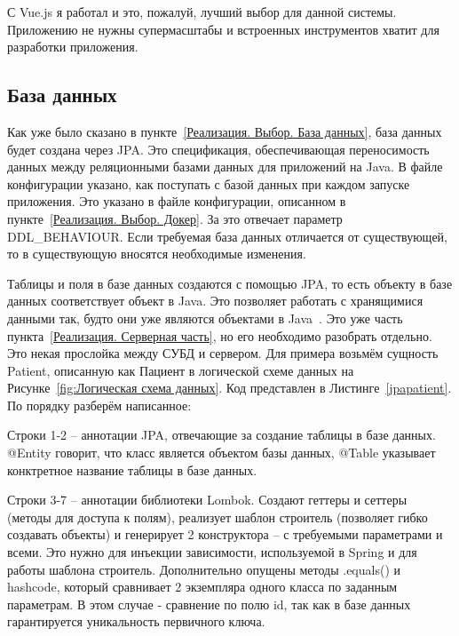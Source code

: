 \documentclass[a4paper,article]{article}
\begin{document}
    С Vue.js я работал и это, пожалуй, лучший выбор для данной системы. Приложению не нужны супермасштабы и встроенных инструментов хватит для разработки приложения.

    \subsection{База данных}\label{Реализация. База данных}

    Как уже было сказано в пункте~\ref{Реализация. Выбор. База данных}, база данных будет создана через JPA. Это спецификация, обеспечивающая переносимость данных между реляционными базами данных для приложений на Java. В файле конфигурации указано, как поступать с базой данных при каждом запуске приложения. Это указано в файле конфигурации, описанном в пункте~\ref{Реализация. Выбор. Докер}. За это отвечает параметр {DDL\_BEHAVIOUR}. Если требуемая база данных отличается от существующей, то в существующую вносятся необходимые изменения.

    Таблицы и поля в базе данных создаются с помощью JPA, то есть объекту в базе данных соответствует объект в Java. Это позволяет работать с хранящимися данными так, будто они уже являются объектами в Java~\cite{baeldungbook}. Это уже часть пункта~\ref{Реализация. Серверная часть}, но его необходимо разобрать отдельно. Это некая прослойка между СУБД и сервером. Для примера возьмём сущность Patient, описанную как Пациент в логической схеме данных на Рисунке~\ref{fig:Логическая схема данных}. Код представлен в Листинге~\ref{jpapatient}. По порядку разберём написанное:

    Строки 1-2 -- аннотации JPA, отвечающие за создание таблицы в базе данных. @Entity говорит, что класс является объектом базы данных, @Table указывает конктретное название таблицы в базе данных.

    Строки 3-7 -- аннотации библиотеки Lombok. Создают геттеры и сеттеры (методы для доступа к полям), реализует шаблон строитель (позволяет гибко создавать объекты) и генерирует 2 конструктора -- с требуемыми параметрами и всеми. Это нужно для инъекции зависимости, используемой в Spring и для работы шаблона строитель. Дополнительно опущены методы .equals() и hashcode, который сравнивает 2 экземпляра одного класса по заданным параметрам. В этом случае - сравнение по полю id, так как в базе данных гарантируется уникальность первичного ключа.

    \newpage
\end{document}
